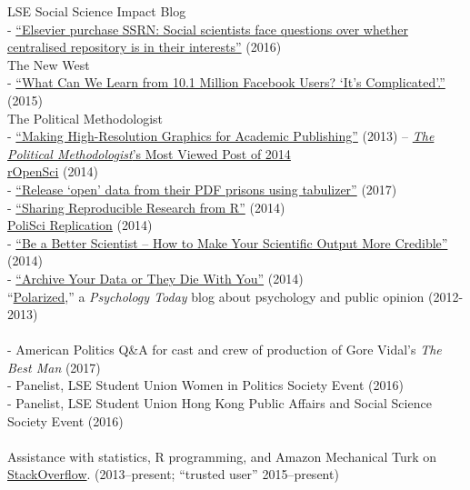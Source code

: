 \documentclass[12pt]{article}
\newcommand{\topic}[1]{\pagebreak[3]\indent {\color{lg}{\footnotesize #1 }}\\}
\newcommand{\entry}[1]{\indent {\color{lg}\guillemotright}\hspace{2pt}#1\vspace{.25em}\\}
\newcommand{\subentry}[1]{{\color{lg}-} #1\vspace{.25em}\\}
\begin{document}
		\entry{LSE Social Science Impact Blog}
			\subentry{\href{http://blogs.lse.ac.uk/impactofsocialsciences/2016/05/18/elsevier-purchase-ssrn-social-scientists-face-questions-over-whether-centralised-repository-is-in-their-interests/}{``Elsevier purchase SSRN: Social scientists face questions over whether centralised repository is in their interests''} (2016)}
		\entry{The New West}
			\subentry{\href{https://thewpsa.wordpress.com/2015/05/09/what-can-we-learn-from-10-1-million-facebook-users-its-complicated/}{``What Can We Learn from 10.1 Million Facebook Users? `It's Complicated'.''} (2015)}
		\entry{The Political Methodologist}
			\subentry{\href{https://thepoliticalmethodologist.com/2013/11/25/making-high-resolution-graphics-for-academic-publishing/}{``Making High-Resolution Graphics for Academic Publishing''} (2013) -- \href{http://thepoliticalmethodologist.com/2015/01/05/introducing-the-annual-tpm-most-viewed-post-award-and-our-2014-winner/}{\textit{The Political Methodologist}'s Most Viewed Post of 2014}}
		\entry{\href{http://ropensci.org/blog/}{rOpenSci} (2014)}
			\subentry{\href{https://ropensci.org/blog/2017/04/18/tabulizer/}{``Release `open' data from their PDF prisons using tabulizer''} (2017)}
            \subentry{\href{https://ropensci.org/blog/2014/02/20/dvn-dataverse-network/}{``Sharing Reproducible Research from R''} (2014)}
		\entry{\href{http://politicalsciencereplication.wordpress.com/}{PoliSci Replication} (2014)}
			\subentry{\href{https://politicalsciencereplication.wordpress.com/2014/06/04/guest-post-be-a-better-scientist-how-to-make-your-scientific-output-more-credible-by-thomas-leeper/}{``Be a Better Scientist -- How to Make Your Scientific Output More Credible''} (2014)}
			\subentry{\href{https://politicalsciencereplication.wordpress.com/2014/05/21/guest-post-why-reproducibility-requires-data-archiving-by-thomas-leeper/}{``Archive Your Data or They Die With You''} (2014)}
		\entry{``\href{http://www.psychologytoday.com/blog/polarized}{Polarized},'' a \textit{Psychology Today} blog about psychology and public opinion (2012-2013)}
	
	\topic{Public and non-academic presentations}
		\subentry{American Politics Q\&A for cast and crew of production of Gore Vidal's \textit{The Best Man} (2017)}
        \subentry{Panelist, LSE Student Union Women in Politics Society Event (2016)}
        \subentry{Panelist, LSE Student Union Hong Kong Public Affairs and Social Science Society Event (2016)}

	\topic{Miscellaneous}
		\entry{Assistance with statistics, R programming, and Amazon Mechanical Turk on \href{http://stackoverflow.com/users/2338862/thomas}{StackOverflow}. (2013--present; ``trusted user'' 2015--present)}
\end{document}
